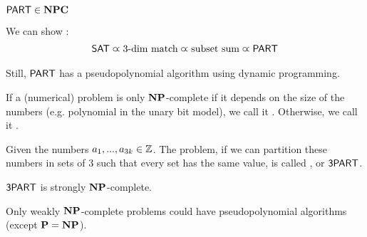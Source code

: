 \begin{theorem}
    $\mathsf{PART} \in \mathbf{NPC}$
\end{theorem}
\begin{sketch}
    We can show \cite[Ch.~15.5]{comb-optimization-korte}:
    \begin{align*}
        \mathsf{SAT} \varpropto \text{3-dim match} \varpropto \text{subset sum} \varpropto \mathsf{PART}
    \end{align*}
\end{sketch}
\begin{remark}
    Still, $\mathsf{PART}$ has a pseudopolynomial algorithm using dynamic programming.
\end{remark}
\begin{definition}
    If a (numerical) problem is only $\mathbf{NP}$-complete if it depends on the size
    of the numbers (e.g. polynomial in the unary bit model), we call it .
    Otherwise, we call it .
\end{definition}
\begin{definition}
    Given the numbers $a_1,...,a_{3k} \in \mathbb{Z}$. The problem, if we can partition these numbers
    in sets of 3 such that every set has the same value, is called , or $\mathsf{3PART}$.
\end{definition}
\begin{theorem}
    $\mathsf{3PART}$ is strongly $\mathbf{NP}$-complete.
\end{theorem}
\begin{remark}
    Only weakly $\mathbf{NP}$-complete problems could have pseudopolynomial algorithms (except $\mathbf{P} = \mathbf{NP}$).
\end{remark}